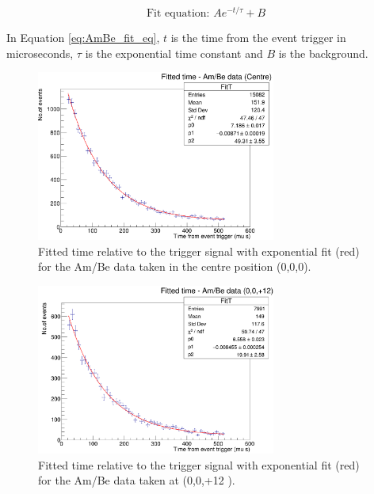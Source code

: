 \begin{equation}
\text{Fit equation: } A e^{-t / \tau}+B
\label{eq:AmBe_fit_eq}
\end{equation}

In Equation \ref{eq:AmBe_fit_eq}, $t$ is the time from the event trigger in microseconds, $\tau$ is the exponential time constant and $B$ is the background. 

\begin{figure}
    \centering
    \includegraphics[width=0.7\textwidth]{Figures/ambe_centre.png}
    \caption{Fitted time relative to the trigger signal with exponential fit (red) for the Am/Be data taken in the centre position (0,0,0).}
    \label{fig:ambe_centre}
\end{figure}

\begin{figure}
    \centering
    \includegraphics[width=0.7\textwidth]{Figures/ambe_data_+12z.png}
    \caption{Fitted time relative to the trigger signal with exponential fit (red) for the Am/Be data taken at (0,0,+12 ).}
    \label{fig:ambe_+12z}
\end{figure}

